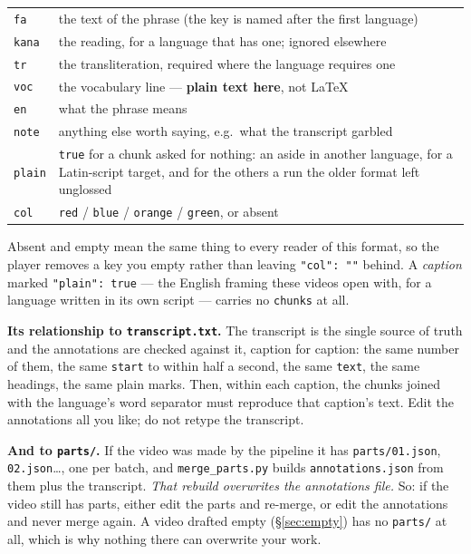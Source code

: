 \documentclass[11pt,oneside]{report}
\newcommand{\file}[1]{\texttt{#1}}
\begin{document}
\begin{center}
\begin{tabular}{@{}p{}p{}@{}}
\toprule
\texttt{fa} & the text of the phrase (the key is named after the first
  language) \\
\texttt{kana} & the reading, for a language that has one; ignored elsewhere \\
\texttt{tr} & the transliteration, required where the language requires one \\
\texttt{voc} & the vocabulary line --- \textbf{plain text here}, not LaTeX \\
\texttt{en} & what the phrase means \\
\texttt{note} & anything else worth saying, e.g.\ what the transcript garbled \\
\texttt{plain} & \texttt{true} for a chunk asked for nothing: an aside in
  another language, for a Latin-script target, and for the others a run the
  older format left unglossed \\
\texttt{col} & \texttt{red} / \texttt{blue} / \texttt{orange} /
  \texttt{green}, or absent \\
\bottomrule
\end{tabular}
\end{center}

\noindent Absent and empty mean the same thing to every reader of this format,
so the player removes a key you empty rather than leaving \texttt{"col": ""}
behind. A \emph{caption} marked \texttt{"plain": true} --- the English framing
these videos open with, for a language written in its own script --- carries
no \texttt{chunks} at all.

\textbf{Its relationship to \file{transcript.txt}.} The transcript is the
single source of truth and the annotations are checked against it, caption for
caption: the same number of them, the same \texttt{start} to within half a
second, the same \texttt{text}, the same headings, the same plain marks. Then,
within each caption, the chunks joined with the language's word separator must
reproduce that caption's text. Edit the annotations all you like; do not
retype the transcript.

\textbf{And to \file{parts/}.} If the video was made by the pipeline it has
\file{parts/01.json}, \file{02.json}\ldots, one per batch, and
\file{merge\_parts.py} builds \file{annotations.json} from them plus the
transcript. \emph{That rebuild overwrites the annotations file.} So: if the
video still has parts, either edit the parts and re-merge, or edit the
annotations and never merge again. A video drafted empty (\S\ref{sec:empty})
has no \file{parts/} at all, which is why nothing there can overwrite your
work.
\end{document}
